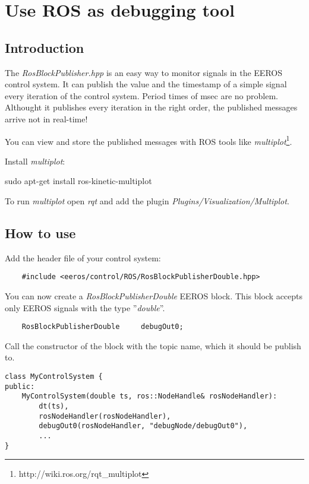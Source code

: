 \section{Use ROS as debugging tool}
\label{rosAsDebuggingTool}
\subsection{Introduction}
The \textit{RosBlockPublisher.hpp} is an easy way to monitor signals in the EEROS control system.
It can publish the value and the timestamp of a simple signal every iteration of the control system.
Period times of \unit[1]{msec} are no problem.
Althought it publishes every iteration in the right order, the published messages arrive not in real-time!

You can view and store the published messages with ROS tools like \textit{multiplot}\footnote{http://wiki.ros.org/rqt\_multiplot}.

Install \textit{multiplot}:
\begin{snugshade*}
	sudo apt-get install ros-kinetic-multiplot
\end{snugshade*}

To run \textit{multiplot} open \textit{rqt} and add the plugin \textit{Plugins/Visualization/Multiplot}.

\subsection{How to use}
Add the header file of your control system:
\lstset{language=c}
\begin{lstlisting}
	#include <eeros/control/ROS/RosBlockPublisherDouble.hpp>
\end{lstlisting}

You can now create a \textit{RosBlockPublisherDouble} EEROS block.
This block accepts only EEROS signals with the type ''\textit{double}''.
\lstset{language=c}
\begin{lstlisting}
	RosBlockPublisherDouble		debugOut0;
\end{lstlisting}

Call the constructor of the block with the topic name, which it should be publish to.
\lstset{language=c}
\begin{lstlisting}
class MyControlSystem {
public:
	MyControlSystem(double ts, ros::NodeHandle& rosNodeHandler):
		dt(ts),
		rosNodeHandler(rosNodeHandler),
		debugOut0(rosNodeHandler, "debugNode/debugOut0"),
		...
}
\end{lstlisting}

